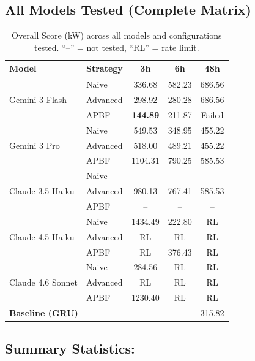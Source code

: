 \documentclass{article}
\begin{document}
\clearpage

\subsection*{All Models Tested (Complete Matrix)}

\begin{table}[h!]
\centering
\caption{Overall Score (kW) across all models and configurations tested. ``--'' = not tested, ``RL'' = rate limit.}
\label{tab:all_results}
\small
\begin{tabular}{llccc}
\toprule
\textbf{Model} & \textbf{Strategy} & \textbf{3h} & \textbf{6h} & \textbf{48h} \\
\midrule
\multirow{3}{*}{Gemini 3 Flash}
& Naive    & 336.68 & 582.23 & 686.56 \\
& Advanced & 298.92 & 280.28 & 686.56 \\
& APBF     & \textbf{144.89} & 211.87 & Failed \\
\midrule
\multirow{3}{*}{Gemini 3 Pro}
& Naive    & 549.53 & 348.95 & 455.22 \\
& Advanced & 518.00 & 489.21 & 455.22 \\
& APBF     & 1104.31 & 790.25 & 585.53 \\
\midrule
\multirow{3}{*}{Claude 3.5 Haiku}
& Naive    & -- & -- & -- \\
& Advanced & 980.13 & 767.41 & 585.53 \\
& APBF     & -- & -- & -- \\
\midrule
\multirow{3}{*}{Claude 4.5 Haiku}
& Naive    & 1434.49 & 222.80 & RL \\
& Advanced & RL & RL & RL \\
& APBF     & RL & 376.43 & RL \\
\midrule
\multirow{3}{*}{Claude 4.6 Sonnet}
& Naive    & 284.56 & RL & RL \\
& Advanced & RL & RL & RL \\
& APBF     & 1230.40 & RL & RL \\
\midrule
\midrule
\multicolumn{2}{l}{\textbf{Baseline (GRU)}} & -- & -- & 315.82 \\
\bottomrule
\end{tabular}
\end{table}

\vspace{0.5cm}

\subsection*{Summary Statistics:}
\end{document}
